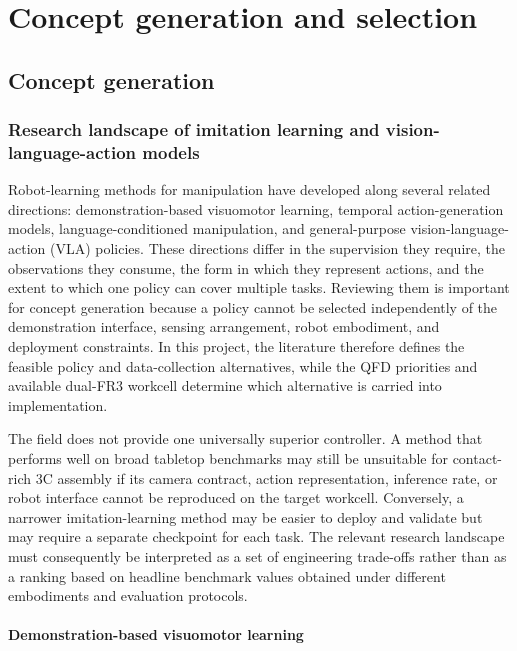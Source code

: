 
\chapter{Concept generation and selection}\label{chap:concept}

\section{Concept generation}

\subsection{Research landscape of imitation learning and vision-language-action models}
\label{sec:research-landscape}

Robot-learning methods for manipulation have developed along several related directions: demonstration-based visuomotor learning, temporal action-generation models, language-conditioned manipulation, and general-purpose vision-language-action (VLA) policies. These directions differ in the supervision they require, the observations they consume, the form in which they represent actions, and the extent to which one policy can cover multiple tasks. Reviewing them is important for concept generation because a policy cannot be selected independently of the demonstration interface, sensing arrangement, robot embodiment, and deployment constraints. In this project, the literature therefore defines the feasible policy and data-collection alternatives, while the QFD priorities and available dual-FR3 workcell determine which alternative is carried into implementation.

The field does not provide one universally superior controller. A method that performs well on broad tabletop benchmarks may still be unsuitable for contact-rich 3C assembly if its camera contract, action representation, inference rate, or robot interface cannot be reproduced on the target workcell. Conversely, a narrower imitation-learning method may be easier to deploy and validate but may require a separate checkpoint for each task. The relevant research landscape must consequently be interpreted as a set of engineering trade-offs rather than as a ranking based on headline benchmark values obtained under different embodiments and evaluation protocols.

\subsubsection{Demonstration-based visuomotor learning}

